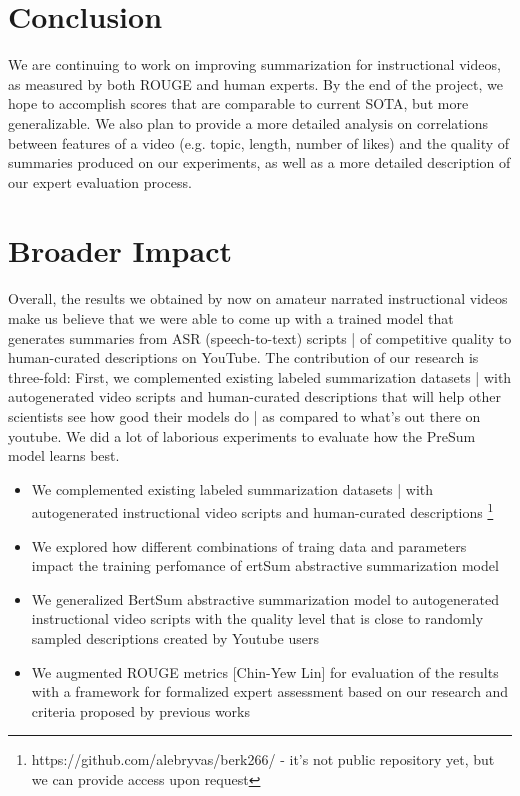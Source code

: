 \documentclass{article}
\begin{document}
\section{Conclusion}
We are continuing to work on improving summarization for instructional videos, as measured by both ROUGE and human experts. By the end of the project, we hope to accomplish scores that are comparable to current SOTA, but more generalizable. We also plan to provide a more detailed analysis on correlations between features of a video (e.g. topic, length, number of likes) and the quality of summaries produced on our experiments, as well as a more detailed description of our expert evaluation process.


\section*{Broader Impact}

Overall, the results we obtained by now on amateur narrated instructional videos  make us believe that we were able to come up with a trained model  that generates summaries from ASR (speech-to-text) scripts | of competitive quality to human-curated descriptions on YouTube. The contribution of our research is three-fold:
First, we complemented existing labeled summarization datasets | with autogenerated video scripts and human-curated descriptions that will help other scientists see how good their models do |  as compared to what’s out there on youtube. We did a lot of laborious experiments to evaluate how the PreSum model learns best.

\begin{itemize}

\item We complemented existing labeled summarization datasets | with autogenerated instructional video scripts and human-curated descriptions \footnote{https://github.com/alebryvas/berk266/ - it's not public repository yet, but we can provide access upon request}
\item We explored how different combinations of traing data and parameters  impact the training perfomance  of ertSum abstractive summarization model
\item We generalized BertSum abstractive summarization model to autogenerated instructional video scripts with the quality level that is close to randomly sampled descriptions created by Youtube users
\item We augmented ROUGE metrics [Chin-Yew Lin] for evaluation of the results with a framework for formalized expert assessment based on our research and criteria proposed by previous works  
\end{itemize}
 
\end{document}
